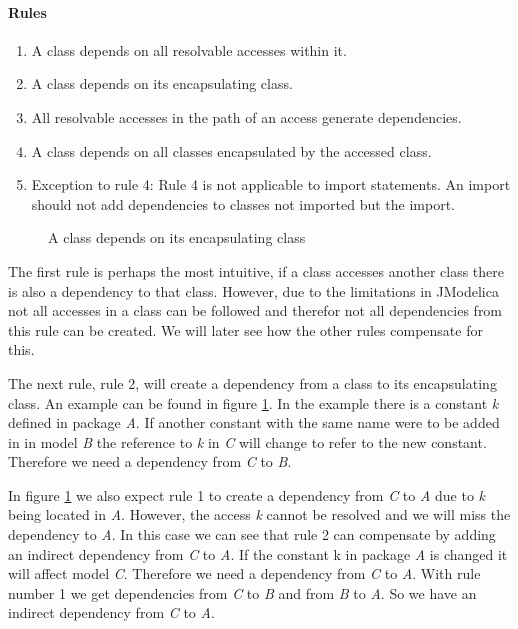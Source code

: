 \documentclass{cslthse-msc}
\begin{document}
\paragraph{Rules}
\begin{enumerate}
\item A class depends on all resolvable accesses within it.
\item A class depends on its encapsulating class. 
\item All resolvable accesses in the path of an access generate dependencies.
\item A class depends on all classes encapsulated by the accessed class.
\item Exception to rule 4: Rule 4 is not applicable to import statements. An import should not add dependencies to classes not imported but the import.
\end{enumerate}


\begin{figure}[!htbp]
    \centering
    \qquad
    \subfloat{\raisebox{3.2 cm}{}}
    \caption{A class depends on its encapsulating class}
    \label{fig:parentGraph}
\end{figure}

The first rule is perhaps the most intuitive, if a class accesses another class there is also a dependency to that class. However, due to the limitations in JModelica not all accesses in a class can be followed and therefor not all dependencies from this rule can be created. We will later see how the other rules compensate for this. 

The next rule, rule 2, will create a dependency from a class to its encapsulating class. An example can be found in figure \ref{fig:parentGraph}. In the example there is a constant \textit{k} defined in package \textit{A}. If another constant with the same name were to be added in in model \textit{B} the reference to \textit{k} in \textit{C} will change to refer to the new constant. Therefore we need a dependency from \textit{C} to \textit{B}.

In figure \ref{fig:parentGraph} we also expect rule 1 to create a dependency from \textit{C} to \textit{A} due to \textit{k} being located in \textit{A}. However, the access \textit{k} cannot be resolved and we will miss the dependency to \textit{A}. In this case we can see that rule 2 can compensate by adding an indirect dependency from \textit{C} to \textit{A}. 
If the constant k in package \textit{A} is changed it will affect model \textit{C}. Therefore we need a dependency from \textit{C} to \textit{A}. With rule number 1 we get dependencies from \textit{C} to \textit{B} and from \textit{B} to \textit{A}. So we have an indirect dependency from \textit{C} to \textit{A}.
\end{document}
